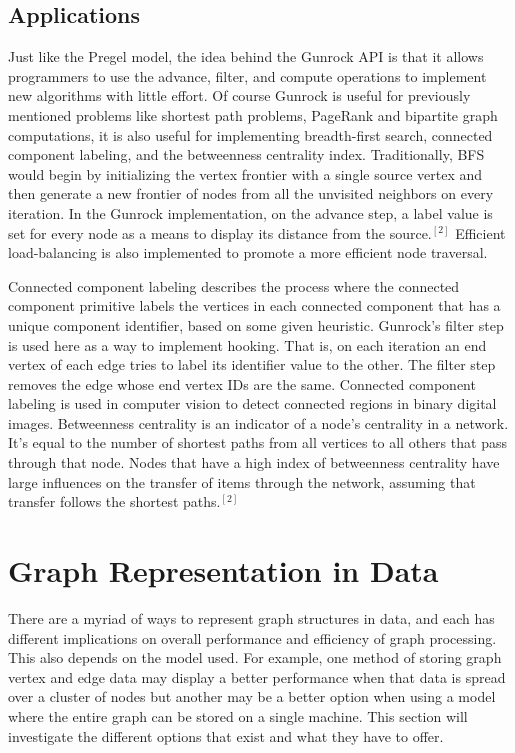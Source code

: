 \documentclass[conference]{IEEEtran}
\begin{document}
\subsection{Applications}

Just like the Pregel model, the idea behind the Gunrock API is that it allows programmers to use the advance, filter, and compute operations to implement new algorithms with little effort.  Of course Gunrock is useful for previously mentioned problems like shortest path problems, PageRank and bipartite graph computations, it is also useful for implementing breadth-first search, connected component labeling, and the betweenness centrality index.  Traditionally, BFS would begin by initializing the vertex frontier with a single source vertex and then generate a new frontier of nodes from all the unvisited neighbors on every iteration.  In the Gunrock implementation, on the advance step, a label value is set for every node as a means to display its distance from the source.$^{[2]}$  Efficient load-balancing is also implemented to promote a more efficient node traversal.  

Connected component labeling describes the process where the connected component primitive labels the vertices in each connected component that has a unique component identifier, based on some given heuristic.  Gunrock's filter step is used here as a way to implement hooking.  That is, on each iteration an end vertex of each edge tries to label its identifier value to the other.  The filter step removes the edge whose end vertex IDs are the same.  Connected component labeling is used in computer vision to detect connected regions in binary digital images.  Betweenness centrality is an indicator of a node's centrality in a network.  It's equal to the number of shortest paths from all vertices to all others that pass through that node.  Nodes that have a high index of betweenness centrality have large influences on the transfer of items through the network, assuming that transfer follows the shortest paths.$^{[2]}$  

\section{Graph Representation in Data}

There are a myriad of ways to represent graph structures in data, and each has different implications on overall performance and efficiency of graph processing.  This also depends on the model used.  For example, one method of storing graph vertex and edge data may display a better performance when that data is spread over a cluster of nodes but another may be a better option when using a model where the entire graph can be stored on a single machine.  This section will investigate the different options that exist and what they have to offer.  
\end{document}

